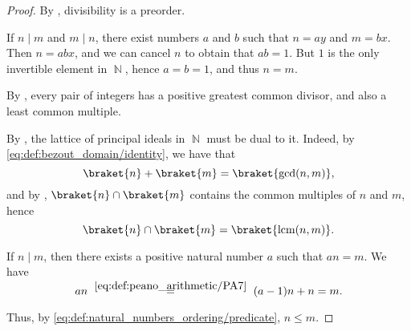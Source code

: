 \begin{proof}
  By , divisibility is a preorder.

   If \( n \mid m \) and \( m \mid n \), there exist numbers \( a \) and \( b \) such that \( n = ay \) and \( m = bx \). Then \( n = abx \), and we can cancel \( n \) to obtain that \( ab = 1 \). But \( 1 \) is the only invertible element in \( \BbbN \), hence \( a = b = 1 \), and thus \( n = m \).

   By , every pair of integers has a positive greatest common divisor, and also a least common multiple.

  By , the lattice of principal ideals in \( \BbbN \) must be dual to it. Indeed, by \eqref{eq:def:bezout_domain/identity}, we have that
  \begin{equation*}
    \braket{n} + \braket{m} = \braket{ \gcd(n, m) },
  \end{equation*}
  and by , \( \braket{n} \cap \braket{m} \) contains the common multiples of \( n \) and \( m \), hence
  \begin{equation*}
    \braket{n} \cap \braket{m} = \braket{ \lcm(n, m) }.
  \end{equation*}

   If \( n \mid m \), then there exists a positive natural number \( a \) such that \( an = m \). We have
  \begin{equation*}
    an
    \reloset{\eqref{eq:def:peano_arithmetic/PA7}} =
    (a - 1)n + n
    =
    m.
  \end{equation*}

  Thus, by \eqref{eq:def:natural_numbers_ordering/predicate}, \( n \leq m \).
\end{proof}
